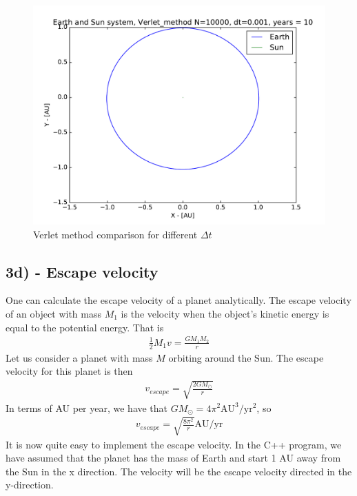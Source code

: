 \documentclass[12pt]{article}
\begin{document}
\begin{figure}[!h]
\centering
\includegraphics[width=\linewidth]{Plots/Earth_Sun_Verlet_method_larger_dt.pdf}
\caption{Verlet method comparison for different $\Delta t$}
\label{fig:balle3}
\end{figure}
\FloatBarrier

\newpage
\subsection*{3d) - Escape velocity}
One can calculate the escape velocity of a planet analytically. The escape velocity of an object with mass $M_1$ is the velocity when the object's kinetic energy is equal to the potential energy. That is
\begin{align*}
\frac{1}{2}M_1v = \frac{GM_1M_2}{r}
\end{align*}
Let us consider a planet with mass $M$ orbiting around the Sun. The escape velocity for this planet is then
\begin{align*}
v_{escape} = \sqrt{\frac{2GM_{\odot}}{r}}
\end{align*}
In terms of AU per year, we have that $GM_{\odot} = 4\pi^2 \text{AU}^3/\text{yr}^2$, so
\begin{align*}
v_{escape} = \sqrt{\frac{8\pi^2}{r}} \text{AU}/\text{yr}
\end{align*}
It is now quite easy to implement the escape velocity. In the C++ program, we have assumed that the planet has the mass of Earth and start 1 AU away from the Sun in the x direction. The velocity will be the escape velocity directed in the y-direction. 
\end{document}
